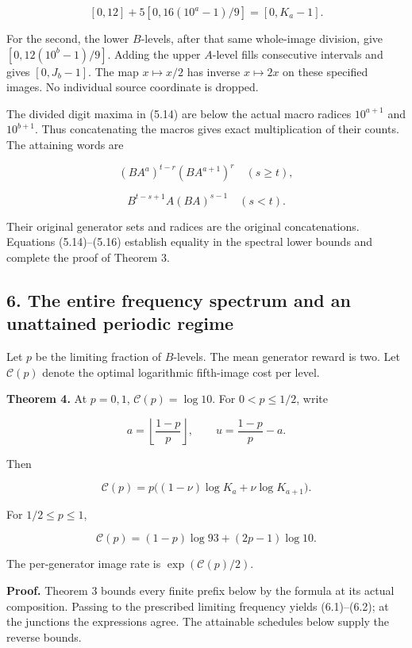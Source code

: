 \documentclass[11pt,a4paper]{article}
\begin{document}
\[
[0,12]+5[0,16(10^a-1)/9]
=[0,K_a-1].
\]

For the second, the lower \(B\)-levels, after that same whole-image division, give \([0,12(10^b-1)/9]\). Adding the upper \(A\)-level fills consecutive intervals and gives \([0,J_b-1]\). The map \(x\mapsto x/2\) has inverse \(x\mapsto2x\) on these specified images. No individual source coordinate is dropped.

The divided digit maxima in (5.14) are below the actual macro radices \(10^{a+1}\) and \(10^{b+1}\). Thus concatenating the macros gives exact multiplication of their counts. The attaining words are

\[
(BA^a)^{t-r}(BA^{a+1})^r\quad(s\ge t),
\tag{5.15}
\]

\[
B^{t-s+1}A(BA)^{s-1}\quad(s<t).
\tag{5.16}
\]

Their original generator sets and radices are the original concatenations. Equations (5.14)--(5.16) establish equality in the spectral lower bounds and complete the proof of Theorem 3.

\subsection{6. The entire frequency spectrum and an unattained periodic regime}\label{eporig:the-entire-frequency-spectrum-and-an-unattained-periodic-regime}

Let \(p\) be the limiting fraction of \(B\)-levels. The mean generator reward is two. Let \(\mathcal C(p)\) denote the optimal logarithmic fifth-image cost per level.

\textbf{Theorem 4.} At \(p=0,1\), \(\mathcal C(p)=\log10\). For \(0<p\le1/2\), write

\[
a=\left\lfloor\frac{1-p}{p}\right\rfloor,\qquad
u=\frac{1-p}{p}-a.
\]

Then

\[
\boxed{\mathcal C(p)=p\bigl((1-\nu)\log K_a+\nu\log K_{a+1}\bigr).}
\tag{6.1}
\]

For \(1/2\le p\le1\),

\[
\boxed{\mathcal C(p)=(1-p)\log93+(2p-1)\log10.}
\tag{6.2}
\]

The per-generator image rate is \(\exp(\mathcal C(p)/2)\).

\textbf{Proof.} Theorem 3 bounds every finite prefix below by the formula at its actual composition. Passing to the prescribed limiting frequency yields (6.1)--(6.2); at the junctions the expressions agree. The attainable schedules below supply the reverse bounds.
\end{document}
